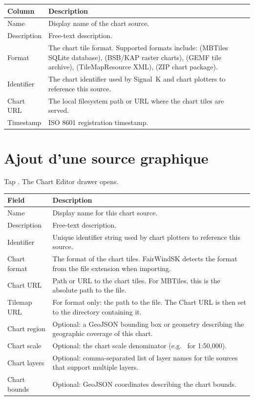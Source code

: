 \begin{longtable}{L{2.4cm} L{11.3cm}}
\toprule
{}
{\sffamily\bfseries\color{white} Column} &
{\sffamily\bfseries\color{white} Description} \\
\midrule
Name & Display name of the chart source. \\
Description & Free-text description. \\
Format & The chart tile format. Supported formats include:  (MBTiles SQLite database),  (BSB/KAP raster charts),  (GEMF tile archive),  (TileMapResource XML),  (ZIP chart package). \\
Identifier & The chart identifier used by Signal~K and chart plotters to reference this source. \\
Chart URL & The local filesystem path or URL where the chart tiles are served. \\
Timestamp & ISO 8601 registration timestamp. \\
\bottomrule
\end{longtable}

\section{Ajout d'une source graphique}

Tap . The Chart Editor drawer opens.

\begin{longtable}{L{3cm} L{10.7cm}}
\toprule
{}
{\sffamily\bfseries\color{white} Field} &
{\sffamily\bfseries\color{white} Description} \\
\midrule
Name & Display name for this chart source. \\
Description & Free-text description. \\
Identifier & Unique identifier string used by chart plotters to reference this source. \\
Chart format & The format of the chart tiles. FairWindSK detects the format from the file extension when importing. \\
Chart URL & Path or URL to the chart tiles. For MBTiles, this is the absolute path to the  file. \\
Tilemap URL & For  format only: the path to the  file. The Chart URL is then set to the directory containing it. \\
Chart region & Optional: a GeoJSON bounding box or geometry describing the geographic coverage of this chart. \\
Chart scale & Optional: the chart scale denominator (e.g.\  for 1:50,000). \\
Chart layers & Optional: comma-separated list of layer names for tile sources that support multiple layers. \\
Chart bounds & Optional: GeoJSON coordinates describing the chart bounds. \\
\bottomrule
\end{longtable}

